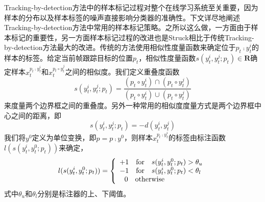 Tracking-by-detection方法中的样本标记过程对整个在线学习系统至关重要，因为样本的分布以及样本标签的噪声直接影响分类器的准确性。下文详尽地阐述Tracking-by-detection方法中常用的样本标记策略。之所以这么做，一方面由于样本标记的重要性，另一方面样本标记过程的改进也是Struck相比于传统Tracking-by-detection方法最大的改进。传统的方法使用相似性度量函数来确定位于${p_t} \comp y_t^i$的样本的标签。给定当前帧跟踪目标的位置$p_t$，相似性度量函数$s(y_t^i,y_t^j;p_t)\in\textbf{R}$确定样本$x_t^{{p_t} \comp y_t^i}$和$x_t^{{p_t} \circ y_t^j}$之间的相似度。我们定义重叠度函数
\begin{equation}
s(y_t^i,y_t^j;{p_t}) = \frac{{({p_t} \circ y_t^i) \cap ({p_t} \circ y_t^j)}}{{({p_t} \circ y_t^i) \cup ({p_t} \circ y_t^j)}}
\end{equation}
来度量两个边界框之间的重叠度。另外一种常用的相似度度量方式是两个边界框中心之间的距离，即 
\begin{equation}
s({y}_t^i,y_t^j;p_t) =  -d(y_t^i,y_t^j)
\end{equation}我们将$y^0$定义为单位变换，即$p=p \comp y^0$，则样本$x_t^{p_t \comp y_t^i}$的标签由标注函数$l(s(y_t^i,y_t^0;{p_t}))$来确定，
\begin{equation}
l(s(y_t^i,y_t^0;{p_t})) = \left\{ \begin{array}{l}

+1 \quad {\rm{for}}\quad s(y_t^i,y_t^0;{p_t}) > {\theta _u}\\

-1 \quad {\rm{for}} \quad s(y_t^i,y_t^0;{p_t}) < {\theta _l}\\

{\rm{\ \ }}0 \quad {\rm{ otherwise}}

\end{array} \right.
\end{equation}
式中$\theta_u$和$\theta_l$分别是标注器的上、下阈值。

